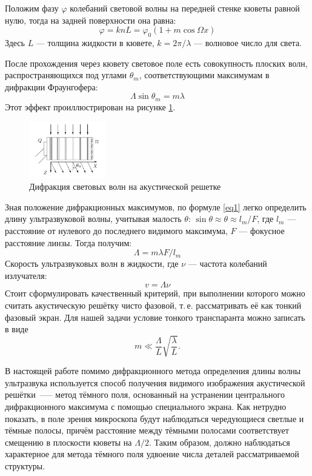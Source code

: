 \documentclass[a4paper,12pt]{article} %
\begin{document}
Положим фазу $ \varphi $ колебаний световой волны на передней стенке кюветы равной нулю, тогда на задней поверхности она равна:
\begin{equation*}
    \varphi  = k n L = \varphi_0 (1 + m \cos \Omega x)
\end{equation*}
Здесь $ L $ --- толщина жидкости в кювете, $ k = 2 \pi / \lambda $ --- волновое число для света.

После прохождения через кювету световое поле есть совокупность плоских волн, распространяющихся под углами $ \theta_m$, соответствующими максимумам в дифракции Фраунгофера:
\begin{equation}\label{eq1}	
    \Lambda \sin \theta_m = m \lambda
\end{equation}
Этот эффект проиллюстрирован на рисунке \ref{diff}.
\begin{figure}[h!]
    \centering	
    \includegraphics[width=0.3\textwidth]{pics/difraction.png}
    \caption{Дифракция световых волн на акустической решетке}
    \label{diff}
\end{figure}

Зная положение дифракционных максимумов, по формуле \eqref{eq1} легко определить длину ультразвуковой волны, учитывая малость $ \theta $: $ \sin \theta \approx \theta \approx l_m /F  $, где $ l_m $ --- расстояние от нулевого до последнего видимого максимума, $ F $ --- фокусное расстояние линзы. Тогда получим:
\begin{equation}
    \label{eq:1}
    \Lambda = m \lambda F/ l_m 
\end{equation}
Скорость ультразвуковых волн в жидкости, где $ \nu $ --- частота колебаний излучателя:
\begin{equation}
    v = \Lambda \nu 
\end{equation}
Стоит сформулировать качественный критерий, при выполнении
которого можно считать акустическую решётку чисто фазовой, т.\,е. рассматривать её как тонкий фазовый экран. Для нашей задачи условие
тонкого транспаранта можно записать в виде
\[
m\ll \frac{\Lambda}{L}\sqrt{\frac{\lambda}{L}}.
\]

В настоящей работе помимо дифракционного метода определения длины волны ультразвука используется способ получения видимого изображения акустической решётки~--— метод тёмного поля, основанный на устранении центрального дифракционного максимума с помощью специального экрана. Как нетрудно показать, в поле зрения микроскопа будут наблюдаться чередующиеся светлые и тёмные полосы, причём расстояние между тёмными полосами соответствует смещению в плоскости кюветы на $\Lambda/2$. Таким образом, должно наблюдаться характерное для метода тёмного поля удвоение числа деталей рассматриваемой структуры.


\end{document}
